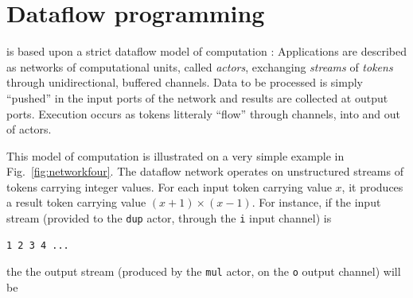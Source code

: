 
\chapter{Dataflow programming}
\label{cha:lang-basic}

\caph is based upon a strict dataflow model of computation : Applications are described as networks
of computational units, called \emph{actors}, exchanging \emph{streams} of \emph{tokens} through
unidirectional, buffered channels. Data to be processed is simply ``pushed'' in the input ports of
the network and results are collected at output ports. Execution occurs as tokens litteraly ``flow''
through channels, into and out of actors.

\medskip This model of computation is illustrated on a very simple example in
Fig.~\ref{fig:networkfour}. The dataflow network operates on unstructured streams of tokens
carrying integer values. For each input token carrying value $x$, it produces a result
token carrying value $(x+1)\times(x-1)$. For instance, if the input stream (provided to the
\verb|dup| actor, through the \verb|i| input channel) is

\begin{verbatim}
1 2 3 4 ...
\end{verbatim}

the the output stream (produced by the \texttt{mul} actor, on the \verb|o| output channel) will be

